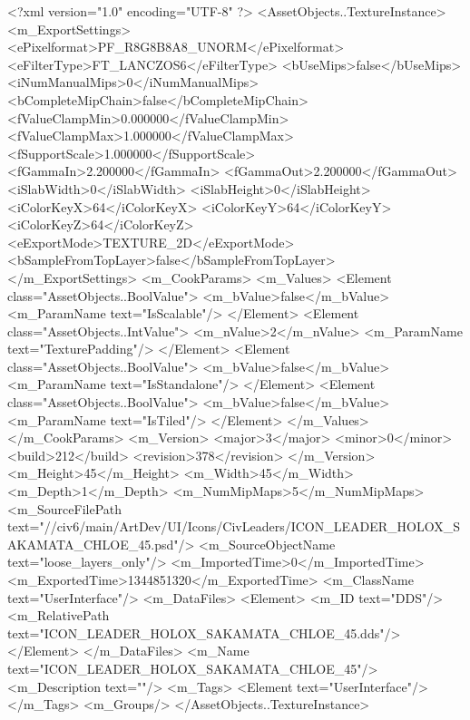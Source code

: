 <?xml version="1.0" encoding="UTF-8" ?>
<AssetObjects..TextureInstance>
	<m_ExportSettings>
		<ePixelformat>PF_R8G8B8A8_UNORM</ePixelformat>
		<eFilterType>FT_LANCZOS6</eFilterType>
		<bUseMips>false</bUseMips>
		<iNumManualMips>0</iNumManualMips>
		<bCompleteMipChain>false</bCompleteMipChain>
		<fValueClampMin>0.000000</fValueClampMin>
		<fValueClampMax>1.000000</fValueClampMax>
		<fSupportScale>1.000000</fSupportScale>
		<fGammaIn>2.200000</fGammaIn>
		<fGammaOut>2.200000</fGammaOut>
		<iSlabWidth>0</iSlabWidth>
		<iSlabHeight>0</iSlabHeight>
		<iColorKeyX>64</iColorKeyX>
		<iColorKeyY>64</iColorKeyY>
		<iColorKeyZ>64</iColorKeyZ>
		<eExportMode>TEXTURE_2D</eExportMode>
		<bSampleFromTopLayer>false</bSampleFromTopLayer>
	</m_ExportSettings>
	<m_CookParams>
		<m_Values>
			<Element class="AssetObjects..BoolValue">
				<m_bValue>false</m_bValue>
				<m_ParamName text="IsScalable"/>
			</Element>
			<Element class="AssetObjects..IntValue">
				<m_nValue>2</m_nValue>
				<m_ParamName text="TexturePadding"/>
			</Element>
			<Element class="AssetObjects..BoolValue">
				<m_bValue>false</m_bValue>
				<m_ParamName text="IsStandalone"/>
			</Element>
			<Element class="AssetObjects..BoolValue">
				<m_bValue>false</m_bValue>
				<m_ParamName text="IsTiled"/>
			</Element>
		</m_Values>
	</m_CookParams>
	<m_Version>
		<major>3</major>
		<minor>0</minor>
		<build>212</build>
		<revision>378</revision>
	</m_Version>
	<m_Height>45</m_Height>
	<m_Width>45</m_Width>
	<m_Depth>1</m_Depth>
	<m_NumMipMaps>5</m_NumMipMaps>
	<m_SourceFilePath text="//civ6/main/ArtDev/UI/Icons/CivLeaders/ICON_LEADER_HOLOX_SAKAMATA_CHLOE_45.psd"/>
	<m_SourceObjectName text="loose_layers_only"/>
	<m_ImportedTime>0</m_ImportedTime>
	<m_ExportedTime>1344851320</m_ExportedTime>
	<m_ClassName text="UserInterface"/>
	<m_DataFiles>
		<Element>
			<m_ID text="DDS"/>
			<m_RelativePath text="ICON_LEADER_HOLOX_SAKAMATA_CHLOE_45.dds"/>
		</Element>
	</m_DataFiles>
	<m_Name text="ICON_LEADER_HOLOX_SAKAMATA_CHLOE_45"/>
	<m_Description text=""/>
	<m_Tags>
		<Element text="UserInterface"/>
	</m_Tags>
	<m_Groups/>
</AssetObjects..TextureInstance>

